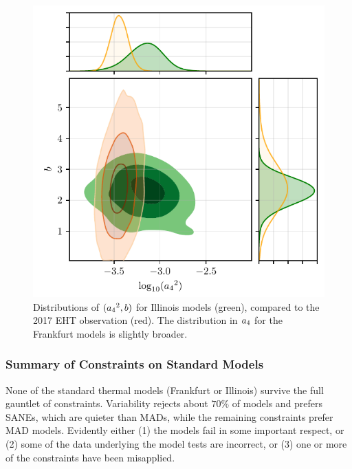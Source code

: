 \begin{figure}
  \centering
  \includegraphics[width=\columnwidth]{./figures/grmhd_triangle_debiased_KHARMA.pdf}
  \caption{Distributions of $({a_4}^2,b)$ for Illinois models (green), compared to the 2017 EHT observation (red). The distribution in ${a_4}$ for the Frankfurt models is slightly broader.}
  \label{fig:cmp_VLBI_var}
\end{figure}


\subsubsection{Summary of Constraints on Standard Models}

None of the standard thermal models (Frankfurt or Illinois) survive the full gauntlet of constraints.   Variability rejects about $70\%$ of models and prefers SANEs, which are quieter than MADs, while the remaining constraints prefer MAD models.
Evidently either (1) the models fail in some important respect, or (2) some of the data underlying the model tests are incorrect, or (3) one or more of the constraints have been misapplied.

